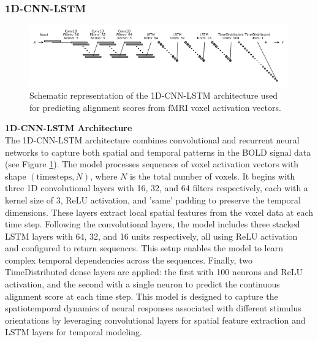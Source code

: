 \documentclass[a4paper]{article}
\begin{document}
\subsubsection{\textbf{1D-CNN-LSTM}}
\begin{figure}
    \centering
    \includegraphics[width=1\linewidth]{hybrid2.png}
    \caption{Schematic representation of the 1D-CNN-LSTM architecture used for predicting alignment scores from
fMRI voxel activation vectors.}
    \label{fig:1D-CNN-LSTM}
\end{figure}

\noindent \textbf{1D-CNN-LSTM Architecture}\\
The 1D-CNN-LSTM architecture combines convolutional and recurrent neural networks to capture both spatial and temporal patterns in the BOLD signal data (see Figure \ref{fig:1D-CNN-LSTM}). The model processes sequences of voxel activation vectors with shape \((\text{timesteps}, N)\), where \(N\) is the total number of voxels. It begins with three 1D convolutional layers with 16, 32, and 64 filters respectively, each with a kernel size of 3, ReLU activation, and 'same' padding to preserve the temporal dimensions. These layers extract local spatial features from the voxel data at each time step. Following the convolutional layers, the model includes three stacked LSTM layers with 64, 32, and 16 units respectively, all using ReLU activation and configured to return sequences. This setup enables the model to learn complex temporal dependencies across the sequences. Finally, two TimeDistributed dense layers are applied: the first with 100 neurons and ReLU activation, and the second with a single neuron to predict the continuous alignment score at each time step. This model is designed to capture the spatiotemporal dynamics of neural responses associated with different stimulus orientations by leveraging convolutional layers for spatial feature extraction and LSTM layers for temporal modeling.\\
\end{document}
